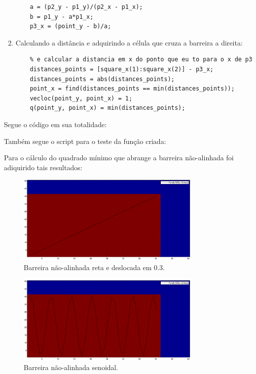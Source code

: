 \begin{enumerate}
\begin{lstlisting}
    a = (p2_y - p1_y)/(p2_x - p1_x);
    b = p1_y - a*p1_x;
    p3_x = (point_y - b)/a;
    \end{lstlisting}
    \item Calculando a distância e adquirindo a célula que cruza a barreira a direita:
    \begin{lstlisting}
    % e calcular a distancia em x do ponto que eu to para o x de p3
    distances_points = [square_x(1):square_x(2)] - p3_x;
    distances_points = abs(distances_points);
    point_x = find(distances_points == min(distances_points));
    vecloc(point_y, point_x) = 1;
    q(point_y, point_x) = min(distances_points);
    \end{lstlisting}
\end{enumerate}

Segue o código em sua totalidade:


Também segue o script para o teste da função criada:


Para o cálculo do quadrado mínimo que abrange a barreira não-alinhada foi adiquirido tais resultados:
\begin{figure}[h!]
    \centering
    \hspace{-1.5cm}
    \includegraphics[width=0.8\textwidth]{code/quadrado_1.eps}
    \caption{Barreira não-alinhada reta e deslocada em 0.3.}
\end{figure}
\begin{figure}[h!]
    \centering
    \hspace{-1.5cm}
    \includegraphics[width=0.8\textwidth]{code/quadrado_2.eps}
    \caption{Barreira não-alinhada senoidal.}
\end{figure}

